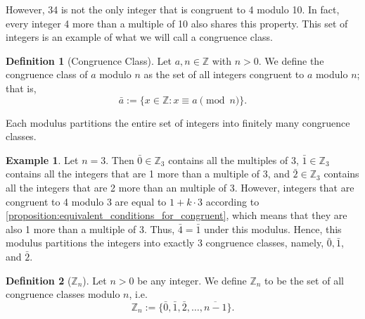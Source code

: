 \documentclass[10pt, titlepage]{amsart}
\newcommand\Z{{\mathbb Z}}
\newcommand\N{{\mathbb N}}
\theoremstyle{definition}
\newtheorem{definition}{Definition}[subsection]
\newtheorem{example}{Example}[subsection]
\begin{document}
	However, 34 is not the only integer that is congruent to 4 modulo 10. In fact, every integer 4 more than a multiple of 10 also shares this property. This set of integers is an example of what we will call a congruence class.


	\begin{definition}[Congruence Class]\label{definition:congruence_class}
		Let $a,n \in \Z$ with $n > 0$. We define the congruence class of $a$ modulo $n$ as the set of all integers congruent to $a$ modulo $n$; that is, $$\bar{a} := \{ x \in \Z : x \equiv a \pmod n \}.$$%
	\end{definition}
	
	Each modulus partitions the entire set of integers into finitely many congruence classes. 
	\begin{example}
		Let $n=3$. Then $\bar{0} \in \Z_3$ contains all the multiples of 3, $\bar{1} \in \Z_3$ contains all the integers that are 1 more than a multiple of 3, and $\bar{2} \in \Z_3$ contains all the integers that are 2 more than an multiple of 3. However, integers that are congruent to 4 modulo 3 are equal to $1 + k \cdot 3$ according to \cref{proposition:equivalent_conditions_for_congruent}, which means that they are also 1 more than a multiple of 3. Thus, $\bar{4} = \bar{1}$ under this modulus. Hence, this modulus partitions the integers into exactly 3 congruence classes, namely, $\bar{0}, \bar{1}$, and $\bar{2}$.
	\end{example}

	\begin{definition}[$\Z_n$]\label{Definition: Zn}
		Let $n > 0$ be any integer. We define $\Z_n$ to be the set of all congruence classes modulo $n$, i.e. $$ \Z_n := \{ \bar{0}, \bar{1}, \bar{2}, \ldots, \overline{n - 1} \}.$$ %
		
%		
	\end{definition}
\end{document}

